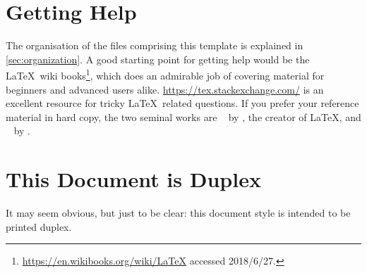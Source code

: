 \section*{Getting Help}
\label{sec:getting-help}
The organisation of the files comprising this template is explained in \autoref{sec:organization}.
A good starting point for getting help would be the \LaTeX\ wiki books\footnote{\url{https://en.wikibooks.org/wiki/LaTeX} accessed 2018/6/27.}, which does an admirable job of covering material for beginners and advanced users
alike.
\url{https://tex.stackexchange.com/} is an excellent resource for tricky \LaTeX\ related questions.
If you prefer your reference material in hard copy, the two seminal works are ~\cite{Lamport1994:LADPSUGARM1994} by \citeauthor{Lamport1994:LADPSUGARM1994}, the creator of \LaTeX,
and ~\cite{Mittelbach2004:TLC2004} by \citeauthor{Mittelbach2004:TLC2004}.

\section*{This Document is Duplex}
\label{sec:print-this-docum}

It may seem obvious, but just to be clear: this document style is intended to be printed duplex.


